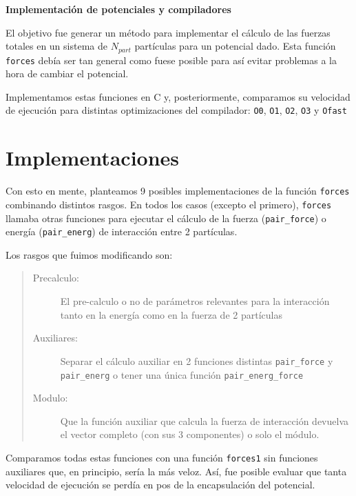 \documentclass[twoside, 12pt]{article}
\begin{document}
\begin{center}
{\fontsize{20pt}{10pt}\textbf{Implementación de potenciales y compiladores}}
\end{center}

El objetivo fue generar un método para implementar el cálculo de las fuerzas totales en un sistema de $N_{part}$ partículas para un potencial dado. Esta función \texttt{forces} debía ser tan general como fuese posible para así evitar problemas a la hora de cambiar el potencial.

Implementamos estas funciones en C y, posteriormente, comparamos su velocidad de ejecución para distintas optimizaciones del compilador: \texttt{O0}, \texttt{O1}, \texttt{O2}, \texttt{O3} y \texttt{Ofast}

\section{Implementaciones}
Con esto en mente, planteamos 9 posibles implementaciones de la función \texttt{forces} combinando distintos rasgos. En todos los casos (excepto el primero), \texttt{forces} llamaba otras funciones para ejecutar el cálculo de la fuerza (\texttt{pair\_force}) o energía (\texttt{pair\_energ}) de interacción entre 2 partículas. 

Los rasgos que fuimos modificando son: 

\begin{quote}
\begin{description}
\item[Precalculo:] El pre-calculo o no de parámetros relevantes para la interacción tanto en la energía como en la fuerza de 2 partículas

\item[Auxiliares:] Separar el cálculo auxiliar en 2 funciones distintas \texttt{pair\_force} y \texttt{pair\_energ} o tener una única función \texttt{pair\_energ\_force}

\item[Modulo:] Que la función auxiliar que calcula la fuerza de interacción devuelva el vector completo (con sus 3 componentes) o solo el módulo.
\end{description}
\end{quote}

Comparamos todas estas funciones con una función \texttt{forces1} sin funciones auxiliares que, en principio, sería la más veloz. Así, fue posible evaluar que tanta velocidad de ejecución se perdía en pos de la encapsulación del potencial. 
\end{document}
